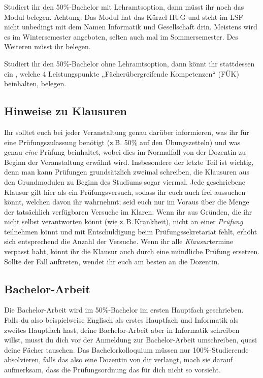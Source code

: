 Studiert ihr den 50\%-Bachelor mit Lehramtsoption, dann müsst ihr noch das Modul  belegen. Achtung: Das Modul hat das Kürzel IIUG und steht im LSF nicht unbedingt mit dem Namen Informatik und Gesellschaft drin. Meistens wird es im Wintersemester angeboten, selten auch mal im Sommersemester. Des Weiteren müsst ihr  belegen.

Studiert ihr den 50\%-Bachelor ohne Lehramtsoption, dann könnt ihr stattdessen ein , welche 4 Leistungspunkte „Fächerübergreifende Kompetenzen“ (FÜK) beinhalten, belegen.

\vspace{-1mm}

\subsection{Hinweise zu Klausuren}
Ihr solltet euch bei jeder Veranstaltung genau darüber informieren, was ihr für eine Prüfungszulassung benötigt (z.B. 50\% auf den Übungszetteln) und was genau \emph{eine} Prüfung beinhaltet, wobei dies im Normalfall von der Dozentin zu Beginn der Veranstaltung erwähnt wird. Insbesondere der letzte Teil ist wichtig, denn man kann Prüfungen grundsätzlich zweimal schreiben, die Klausuren aus den Grundmodulen zu Beginn des Studiums sogar viermal. Jede geschriebene Klausur gilt hier als ein Prüfungsversuch, sodass ihr euch auch frei aussuchen könnt, welchen davon ihr wahrnehmt; seid euch nur im Voraus über die Menge der tatsächlich verfügbaren Versuche im Klaren. Wenn ihr aus Gründen, die ihr nicht selbst verantworten könnt (wie z.\,B.\,Krankheit), nicht an einer \emph{Prüfung} teilnehmen könnt und mit Entschuldigung beim Prüfungssekretariat fehlt, erhöht sich entsprechend die Anzahl der Versuche. Wenn ihr alle \emph{Klausur}termine verpasst habt, könnt ihr die Klausur auch durch eine mündliche Prüfung ersetzen. Sollte der Fall auftreten, wendet ihr euch am besten an die Dozentin.


\subsection{Bachelor-Arbeit}
Die Bachelor-Arbeit wird im 50\%-Bachelor im ersten Hauptfach geschrieben. Falls du also beispielweise Englisch als erstes Hauptfach und Informatik als zweites Hauptfach hast, deine Bachelor-Arbeit aber in Informatik schreiben willst, musst du dich vor der Anmeldung zur Bachelor-Arbeit umschreiben, quasi deine Fächer tauschen. Das Bachelorkolloquium müssen nur 100\%-Studierende absolvieren, falls das also eine Dozentin von dir verlangt, mach sie darauf aufmerksam, dass die Prüfungsordnung das für dich nicht so vorsieht.
